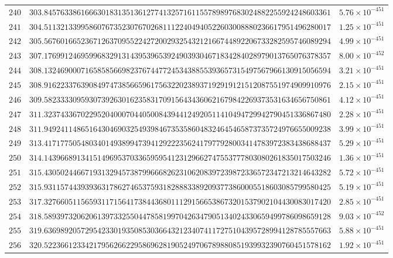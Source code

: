 \documentclass[12pt,reqno]{amsart}
\theoremstyle{remark}
\begin{document}
\begin{longtable}{clc}
$240$ & $303.8457633861666301831351361277413257161155789897683024882255924248603361$ & $5.76\times 10^{-451}$ \\
$241$ & $304.5113213399586076735230767026811122404940522603008880236617951496280017$ & $1.25\times 10^{-451}$ \\
$242$ & $305.5676016652367126370955224272002932543212166744892206733282595746089294$ & $4.99\times 10^{-451}$ \\
$243$ & $307.1769912469599683291314395396539249039304671834284028979013765076378357$ & $8.00\times 10^{-452}$ \\
$244$ & $308.1324690007165858566982376744772453438855393657315497567966130915056594$ & $3.21\times 10^{-451}$ \\
$245$ & $308.9162233763908497473856659617563220238937192919121512087551974909910976$ & $2.15\times 10^{-451}$ \\
$246$ & $309.5823333095930739263016235831709156434360621679842269373531634656750861$ & $4.12\times 10^{-451}$ \\
$247$ & $311.3237433670229520400070440500843944124920511410494729942790451336867480$ & $2.28\times 10^{-451}$ \\
$248$ & $311.9492411486516430469032549398467353586048324645465873735724976655009238$ & $3.99\times 10^{-451}$ \\
$249$ & $313.4171775054803401493899473941292223562417977928003414783972383438688437$ & $5.29\times 10^{-451}$ \\
$250$ & $314.1439668913415149695370336595954123129662747553777803080261835017503246$ & $1.36\times 10^{-451}$ \\
$251$ & $315.4305024466719313294573879966682623106208397239872336572347213214643282$ & $5.72\times 10^{-451}$ \\
$252$ & $315.9311574439393631786274653759318288833892093773860005518603085799580425$ & $5.19\times 10^{-451}$ \\
$253$ & $317.3276605115659311715641738443680111291566538673201537902104430083017420$ & $2.85\times 10^{-451}$ \\
$254$ & $318.5893973206206139733255044785819970426347905134024330659499786098659128$ & $9.03\times 10^{-452}$ \\
$255$ & $319.6369892057295423301935085303664321234074117275104395728994128785557663$ & $5.88\times 10^{-451}$ \\
$256$ & $320.5223661233421795626622958696281905249706789880851939932390760451578162$ & $1.92\times 10^{-451}$ \\

\end{longtable}
\end{document}
